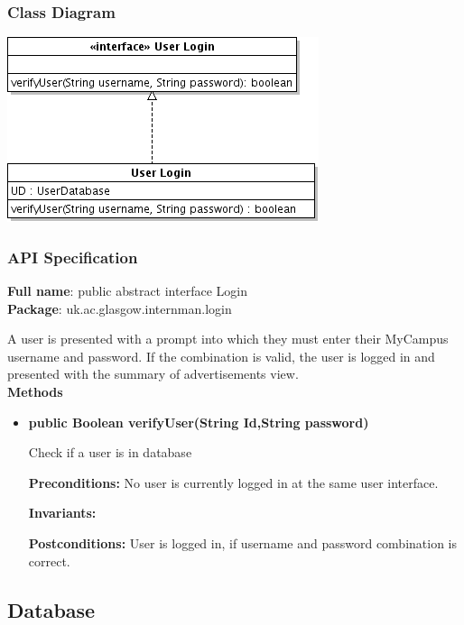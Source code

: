 \documentclass[11pt]{l3deliverable}
\begin{document}
\subsubsection{Class Diagram}

\includegraphics{loginClassDiagram.png}

\subsubsection{API Specification}

\textbf{Full name}: public abstract interface Login\\

\textbf{Package}: uk.ac.glasgow.internman.login

A user is presented with a prompt into which they must enter their MyCampus 
username and password. If the combination is valid, the user is logged in and 
presented with the summary of advertisements view.\\

\textbf{Methods}

\begin{itemize}

\item{\textbf{public Boolean verifyUser(String Id,String password)}

Check if a user is in database 

\textbf{Preconditions:} No user is currently logged in at the same user 
interface.}

\textbf{Invariants:}

\textbf{Postconditions:} User is logged in, if username and password combination 
is correct.

\end{itemize}

\newpage

\subsection{Database}
\end{document}
